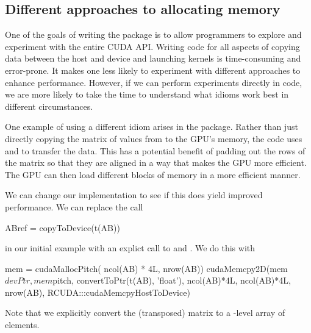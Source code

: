 \subsection{Different approaches to allocating memory} 
One of the goals of writing the  package
is to allow \R{} programmers to explore and experiment
with the entire CUDA API. 
Writing \C{} code for all aspects of copying data between
the host and device and launching kernels is time-consuming and error-prone.
It makes one less likely to experiment with different approaches to
enhance performance. However, if we can perform experiments directly
in  \R{} code, we are more likely to take the time to understand what
idioms work best in different circumstances.

One example of using a different idiom arises in the 
package. Rather than just directly copying the matrix of values from
\R{} to the GPU's memory, the \C{} code uses 
and  to transfer the data.  This has a potential
benefit of padding out the rows of the matrix so that they are aligned
in a way that makes the GPU more efficient. The GPU can then load
different blocks of memory in a more efficient manner.

We can change our implementation  to see if this does yield 
improved performance.
We can replace the call 
\begin{RCode}
ABref = copyToDevice(t(AB))
\end{RCode}
in our initial example with an explict
call to  and .
We do this with
\begin{RCode}
mem = cudaMallocPitch( ncol(AB) * 4L,  nrow(AB))
cudaMemcpy2D(mem$devPtr, mem$pitch, 
             convertToPtr(t(AB), 'float'), 
             ncol(AB)*4L, ncol(AB)*4L, nrow(AB),
             RCUDA:::cudaMemcpyHostToDevice)
\end{RCode}
Note that we explicitly convert the (transposed)
matrix to a \C-level array of  elements.


